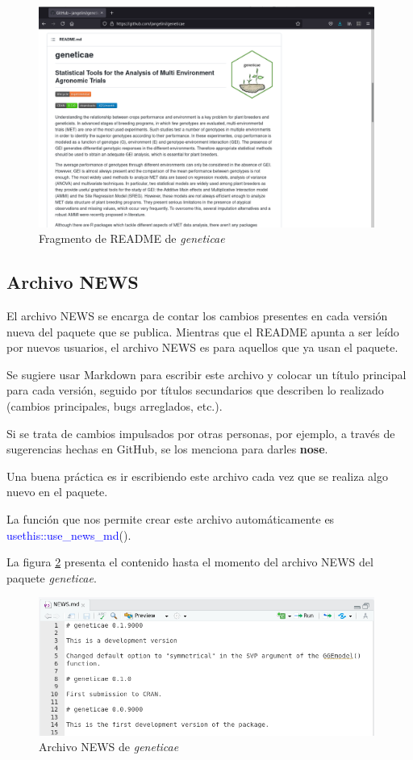 \begin{figure}[H]
	\begin{center}
		\includegraphics[width=11cm]{./Graficos/README.png}	
	\end{center}
	\caption{Fragmento de README de \emph{geneticae}}
	\label{fig:fig36}
\end{figure}


\subsection{Archivo NEWS}

El archivo NEWS se encarga de contar los cambios presentes en cada versión nueva del paquete que se publica. Mientras que el README apunta a ser leído por nuevos usuarios, el archivo NEWS es para aquellos que ya usan el paquete.

Se sugiere usar Markdown para escribir este archivo y colocar un título principal para cada versión, seguido por títulos secundarios que describen lo realizado (cambios principales, bugs arreglados, etc.).

Si se trata de cambios impulsados por otras personas, por ejemplo, a través de sugerencias hechas en GitHub, se los menciona para darles {\huge{\textbf{ nose}}}.

Una buena práctica es ir escribiendo este archivo cada vez que se realiza algo nuevo en el paquete.

La función que nos permite crear este archivo automáticamente es \textcolor{blue}{usethis::use\_news\_md}(). 

La figura \ref{fig:fig37} presenta el contenido hasta el momento del archivo NEWS del paquete \emph{geneticae}.

\begin{figure}[h]
	\begin{center}
		\includegraphics[width=11cm]{./Graficos/News.png}	
	\end{center}
	\caption{Archivo NEWS de \emph{geneticae}}
	\label{fig:fig37}
\end{figure}

